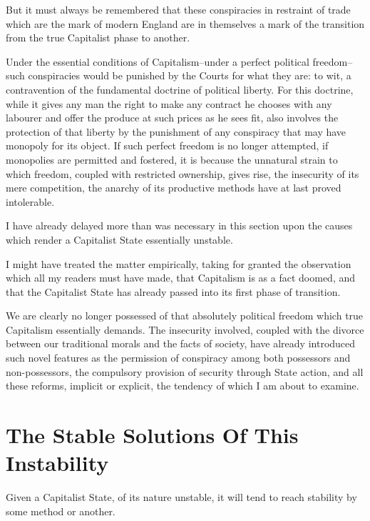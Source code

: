 \documentclass{book}
\begin{document}
But it must always be remembered that these conspiracies in restraint of trade which are the mark of modern England are in themselves a mark of the transition from the true Capitalist phase to another.

Under the essential conditions of Capitalism–under a perfect political freedom–such conspiracies would be punished by the Courts for what they are: to wit, a contravention of the fundamental doctrine of political liberty. For this doctrine, while it gives any man the right to make any contract he chooses with any labourer and offer the produce at such prices as he sees fit, also involves the protection of that liberty by the punishment of any conspiracy that may have monopoly for its object. If such perfect freedom is no longer attempted, if monopolies are permitted and fostered, it is because the unnatural strain to which freedom, coupled with restricted ownership, gives rise, the insecurity of its mere competition, the anarchy of its productive methods have at last proved intolerable.

I have already delayed more than was necessary in this section upon the causes which render a Capitalist State essentially unstable.

I might have treated the matter empirically, taking for granted the observation which all my readers must have made, that Capitalism is as a fact doomed, and that the Capitalist State has already passed into its first phase of transition.

We are clearly no longer possessed of that absolutely political freedom which true Capitalism essentially demands. The insecurity involved, coupled with the divorce between our traditional morals and the facts of society, have already introduced such novel features as the permission of conspiracy among both possessors and non-possessors, the compulsory provision of security through State action, and all these reforms, implicit or explicit, the tendency of which I am about to examine.

\chapter{The Stable Solutions Of This Instability}
\label{chapter-6}
Given a Capitalist State, of its nature unstable, it will tend to reach stability by some method or another.
\end{document}
